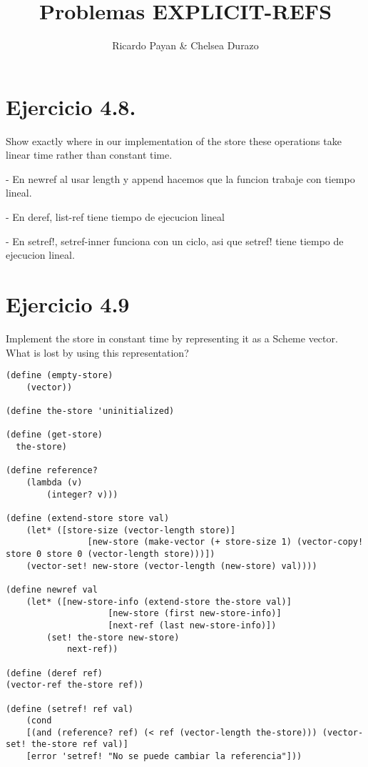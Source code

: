 \documentclass{article}
\title{ Problemas EXPLICIT-REFS }
\author{Ricardo Payan & Chelsea Durazo}
\begin{document}
\maketitle

\section*{Ejercicio 4.8.}


Show exactly where in our implementation of the store these operations take linear time rather than constant time.



- En newref al usar length y append hacemos que la funcion trabaje con tiempo lineal.

- En deref, list-ref tiene tiempo de ejecucion lineal

- En setref!, setref-inner funciona con un ciclo, asi que setref! tiene tiempo de ejecucion lineal.


\section*{Ejercicio 4.9}
Implement the store in constant time by representing it as a Scheme vector. What is lost by using this representation?

\begin{lstlisting}
(define (empty-store)
	(vector))

(define the-store 'uninitialized)

(define (get-store)
  the-store)

(define reference?
	(lambda (v)
		(integer? v)))

(define (extend-store store val)
	(let* ([store-size (vector-length store)]
				[new-store (make-vector (+ store-size 1) (vector-copy! store 0 store 0 (vector-length store)))])
	(vector-set! new-store (vector-length (new-store) val))))

(define newref val
	(let* ([new-store-info (extend-store the-store val)]
					[new-store (first new-store-info)]
					[next-ref (last new-store-info)])
		(set! the-store new-store) 
			next-ref))

(define (deref ref)
(vector-ref the-store ref))

(define (setref! ref val)
	(cond
	[(and (reference? ref) (< ref (vector-length the-store))) (vector-set! the-store ref val)]
	[error 'setref! "No se puede cambiar la referencia"]))
\end{lstlisting}
\end{document}
